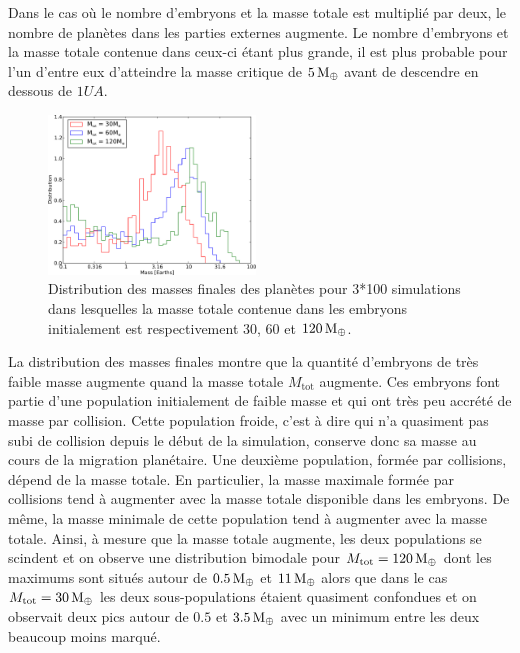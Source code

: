 Dans le cas où le nombre d'embryons et la masse totale est multiplié par deux, le nombre de planètes dans les parties externes augmente. Le nombre d'embryons et la masse totale contenue dans ceux-ci étant plus grande, il est plus probable pour l'un d'entre eux d'atteindre la masse critique de $5\mathrm{\thinspace M_\oplus}$ avant de descendre en dessous de $1\unit{UA}$. 

\begin{figure}[htbp]
\centering
\includegraphics[width=0.49\textwidth]{figure/HSE/m_tot_hist_m.pdf}

\caption[Masses finales des planètes en fonction de la masse initiale totale.]{Distribution des masses finales des planètes pour
3*100 simulations dans lesquelles la masse totale contenue dans les embryons initialement est respectivement $30$, $60$ et
$120\mathrm{\thinspace M_\oplus}$.}\label{fig:HSE_m_tot_hist_m}
\end{figure}

La distribution des masses finales  montre que la quantité d'embryons de très faible masse augmente quand la masse totale $M_\text{tot}$ augmente. Ces embryons font partie d'une population initialement de faible masse et qui ont très peu accrété de masse par collision. Cette population \og froide\fg, c'est à dire qui n'a quasiment pas subi de collision depuis le début de la simulation, conserve donc sa masse au cours de la migration planétaire. Une deuxième population, formée par collisions, dépend de la masse totale. En particulier, la masse maximale formée par collisions tend à augmenter avec la masse totale disponible dans les embryons. De même, la masse minimale de cette population tend à augmenter avec la masse totale. Ainsi, à mesure que la masse totale augmente, les deux populations se scindent et on observe une distribution bimodale pour $M_\text{tot}=120\mathrm{\thinspace M_\oplus}$ dont les maximums sont situés autour de $0.5\mathrm{\thinspace M_\oplus}$ et $11\mathrm{\thinspace M_\oplus}$ alors que dans le cas $M_\text{tot}=30\mathrm{\thinspace M_\oplus}$ les deux sous-populations étaient quasiment confondues et on observait deux pics autour de 
$0.
5$ et $3.5\mathrm{\thinspace M_\oplus}$ avec un minimum entre les deux beaucoup moins marqué.

